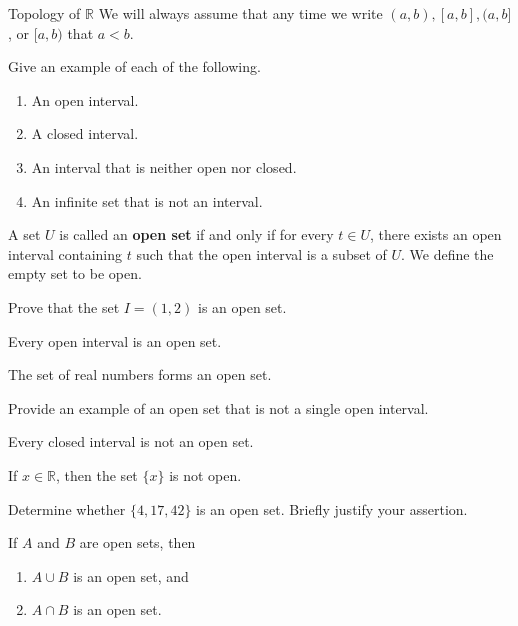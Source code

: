 \begin{section}{Topology of $\mathbb{R}$}
We will always assume that any time we write $(a,b), [a,b], (a,b]$, or $[a,b)$ that $a<b$. 

\begin{exercise}
Give an example of each of the following.
\begin{enumerate}[label=\textrm{(\alph*)}]
\item An open interval.
\item A closed interval.
\item An interval that is neither open nor closed.
\item An infinite set that is not an interval.
\end{enumerate}
\end{exercise}

\begin{definition}
A set $U$ is called an \textbf{open set} if and only if for every $t \in U$, there exists an open interval containing $t$ such that the open interval is a subset of $U$.  We define the empty set to be open.\end{definition}

\begin{problem} 
Prove that the set $I=(1,2)$ is an open set.
\end{problem}

\begin{theorem}
Every open interval is an open set. 
\end{theorem}

\begin{theorem}
The set of real numbers forms an open set.
\end{theorem}

\begin{exercise}
Provide an example of an open set that is not a single open interval.
\end{exercise}

\begin{theorem}
Every closed interval is not an open set.
\end{theorem}

\begin{theorem}
If $x\in\mathbb{R}$, then the set $\{x\}$ is not open.
\end{theorem}

\begin{exercise} 
Determine whether $\{4,17,42\}$ is an open set. Briefly justify your assertion. 
\end{exercise}

\begin{theorem}\label{finite union of open sets}
If $A$ and $B$ are open sets, then 
\begin{enumerate}[label=\textrm{(\alph*)}]
\item $A\cup B$ is an open set, and
\item $A\cap B$ is an open set.
\end{enumerate}
\end{theorem}


\end{section}
